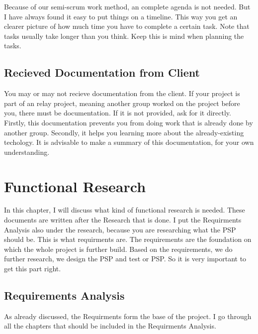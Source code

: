 \documentclass[10pt]{report}
\begin{document}
Because of our semi-scrum work method, an complete agenda is not needed. But I have always found it easy to put things on a timeline. This way you get an clearer picture of how much time you have to complete a certain task. Note that tasks usually take longer than you think. Keep this is mind when planning the tasks.

\newpage

\section{Recieved Documentation from Client}

You may or may not recieve documentation from the client. If your project is part of an relay project, meaning another group worked on the project before you, there must be documentation. If it is not provided, ask for it directly. Firstly, this documentation prevents you from doing work that is already done by another group. Secondly, it helps you learning more about the already-existing techology. It is advisable to make a summary of this documentation, for your own understanding.

\newpage


\chapter{Functional Research}

In this chapter, I will discuss what kind of functional research is needed. These documents are written after the Research that is done. I put the Requirments Analysis also under the research, because you are researching what the PSP should be. This is what requirments are. The requirements are the foundation on which the whole project is further build. Based on the requirements, we do further research, we design the PSP and test or PSP. So it is very important to get this part right.

\medskip
\minitoc

\newpage

\section{Requirements Analysis}

As already discussed, the Requirments form the base of the project. I go through all the chapters that should be included in the Requirments Analysis.
\end{document}
